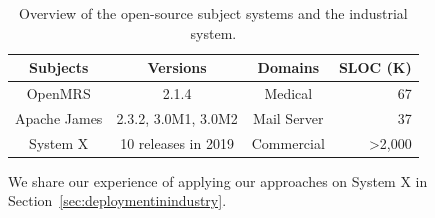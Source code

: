 \begin{table}[tbh]
  \centering
  \caption{Overview of the open-source subject systems and the industrial system.}
    \begin{threeparttable}
    \begin{tabular}{c|c|c|r}
    \hline
    Subjects & Versions & Domains & SLOC (K) \\
    \hline
    OpenMRS & 2.1.4 & Medical & 67 \\
    
    Apache James & 2.3.2, 3.0M1, 3.0M2 & Mail Server & 37 \\
    
    System X\tnote{*} & 10 releases in 2019 & Commercial & \textgreater 2,000 \\
    \hline
    \end{tabular}%
    \begin{tablenotes}
    \item[*] We share our experience of applying our approaches on System X in Section~\ref{sec:deploymentinindustry}.
    \end{tablenotes}
    \end{threeparttable}
  \label{tab:subjects}%
\end{table}%


